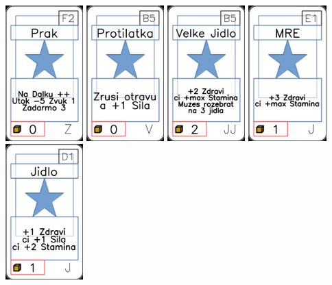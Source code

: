 \documentclass[a4paper]{article}
\begin{document}
	\includegraphics[width=3.0cm]{img-1_86}
	\includegraphics[width=3.0cm]{img-1_69}
	\includegraphics[width=3.0cm]{img-1_39}
	\includegraphics[width=3.0cm]{img-1_20}
	\includegraphics[width=3.0cm]{img-1_15}
\end{document}
